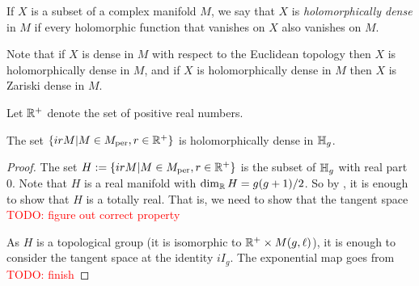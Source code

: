 \documentclass{amsart}
\begin{document}
\begin{definition}
If $X$ is a subset of a complex manifold $M$, we say that $X$ is {\em holomorphically dense} in $M$ if every holomorphic function that vanishes on $X$ also vanishes on $M$.
\end{definition}

\begin{remark}
Note that if $X$ is dense in $M$ with respect to the Euclidean topology then $X$ is holomorphically dense in $M$, and if $X$ is holomorphically dense in $M$ then $X$ is Zariski dense in $M$.
\end{remark}

Let $\mathbb{R}^+$ denote the set of positive real numbers.
\begin{lemma}\label{lemma:holomorphic-closure-irM}
  The set ${\{ irM | M \in M_{\textrm{per}}, r \in \mathbb{R}^+\}}$ is holomorphically dense in $\mathbb{H}_g$.
\end{lemma}


\begin{proof}
  The set $H := \{ irM | M \in M_{\textrm{per}}, r \in \mathbb{R}^+\}$ is the subset of $\mathbb{H}_g$ with real part $0$. Note that $H$ is a real manifold with $\dim_{\mathbb{R}} H = g(g+1)/2$. So by \cite[Ch.~4.8]{krantz2017harmonic}, it is enough to show that $H$ is a totally real. That is, we need to show that the tangent space \textcolor{red}{TODO: figure out correct property}

  As $H$ is a topological group (it is isomorphic to $\mathbb{R}^+ \times M(g,\ell)$), it is enough to consider the tangent space at the identity $iI_g$. The exponential map goes from \textcolor{red}{TODO: finish}
\end{proof}




\end{document}
